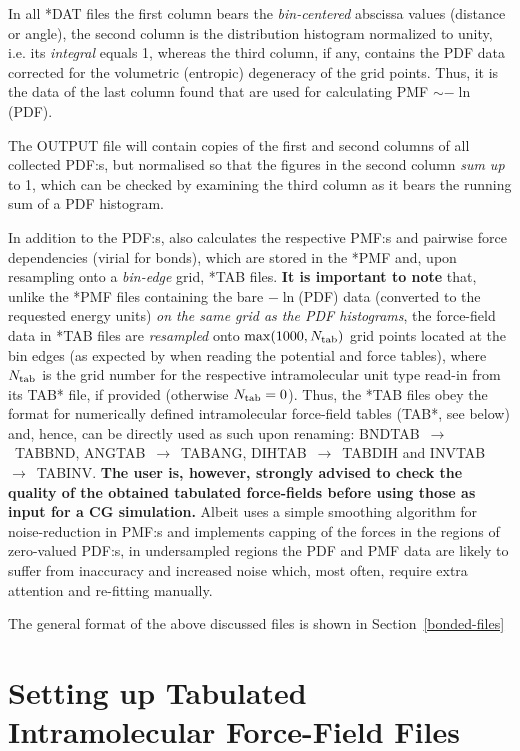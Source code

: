 In all *DAT files the first column bears the {\em bin-centered}
abscissa values (distance or angle), the second column is the distribution
histogram normalized to unity, i.e. its {\em integral} equals 1, whereas
the third column, if any, contains the PDF data corrected for the volumetric
(entropic) degeneracy of the grid points.  Thus, it is the data of the last
column found that are used for calculating PMF $\sim -\ln$(PDF).

The OUTPUT file will contain copies of the first and second
columns of all collected PDF:s, but normalised so that the figures
in the second column {\em sum up} to 1, which can be checked
by examining the third column as it bears the running sum of
a PDF histogram.

In addition to the PDF:s, \D also calculates the respective PMF:s and
pairwise force dependencies (virial for bonds), which are stored in
the *PMF and, upon resampling onto a {\em bin-edge} grid, *TAB files.
{\bf It is important to note} that, unlike the *PMF files containing
the bare $-\ln$(PDF) data (converted to the requested energy units)
{\em on the same grid as the PDF histograms}, the force-field data
in *TAB files are {\em resampled} onto $\max(1000,N_{\rm tab})$ grid points
located at the bin edges (as expected by \D when reading the potential
and force tables), where $N_{\rm tab}$ is the grid number for
the respective intramolecular unit type read-in from its TAB* file,
if provided (otherwise $N_{\rm tab}=0$). Thus, the *TAB files obey
the \D format for numerically defined intramolecular force-field tables
(TAB*, see below) and, hence, can be directly used as such upon renaming:
BNDTAB~$\to$~TABBND, ANGTAB~$\to$~TABANG, DIHTAB~$\to$~TABDIH and INVTAB~$\to$~TABINV.
{\bf The user is, however, strongly advised to check the quality
of the obtained tabulated force-fields before using those as input
for a CG simulation.}  Albeit \D uses a simple smoothing algorithm
for noise-reduction in PMF:s and implements capping of the forces
in the regions of zero-valued PDF:s, in undersampled regions the PDF
and PMF data are likely to suffer from inaccuracy and increased noise
which, most often, require extra attention and re-fitting manually.

The general format of the above discussed files is shown in Section~\ref{bonded-files}

\section{Setting up Tabulated Intramolecular Force-Field Files}
\label{bonded-tables}

